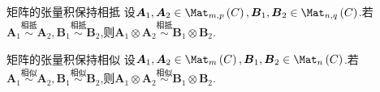 \begin{corollary}{矩阵的张量积保持相抵}{}
	设$\boldsymbol{A}_{1},\boldsymbol{A}_{2}\in\Mat_{m,p}\left(C\right),\boldsymbol{B}_{1},\boldsymbol{B}_{2}\in\Mat_{n,q}\left(C\right)$.若$\boldsymbol{A}_{1}\overset{\text{相抵}}{\sim}\boldsymbol{A}_{2},\boldsymbol{B}_{1}\overset{\text{相抵}}{\sim}\boldsymbol{B}_{2}$,则$\boldsymbol{A}_{1}\otimes\boldsymbol{A}_{2}\overset{\text{相抵}}{\sim}\boldsymbol{B}_{1}\otimes\boldsymbol{B}_{2}$.
\end{corollary}

\begin{corollary}{矩阵的张量积保持相似}{}
	设$\boldsymbol{A}_{1},\boldsymbol{A}_{2}\in\Mat_{m}\left(C\right),\boldsymbol{B}_{1},\boldsymbol{B}_{2}\in\Mat_{n}\left(C\right)$.若$\boldsymbol{A}_{1}\overset{\text{相似}}{\sim}\boldsymbol{A}_{2},\boldsymbol{B}_{1}\overset{\text{相似}}{\sim}\boldsymbol{B}_{2}$,则$\boldsymbol{A}_{1}\otimes\boldsymbol{A}_{2}\overset{\text{相似}}{\sim}\boldsymbol{B}_{1}\otimes\boldsymbol{B}_{2}$.
\end{corollary}